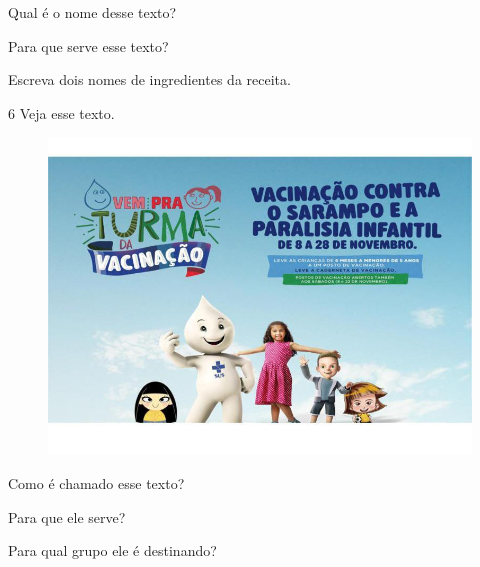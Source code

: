 
\begin{escolha}
\item Qual é o nome desse texto?


\item Para que serve esse texto?


\item Escreva dois nomes de ingredientes da receita.

\end{escolha}

\pagebreak
\num{6} Veja esse texto.


\begin{figure}[htpb!]
\includegraphics[width=\textwidth]{media/image107.jpeg}
\end{figure}


\begin{escolha}
\item Como é chamado esse texto?


\item Para que ele serve?


\item Para qual grupo ele é destinando?

\end{escolha}

